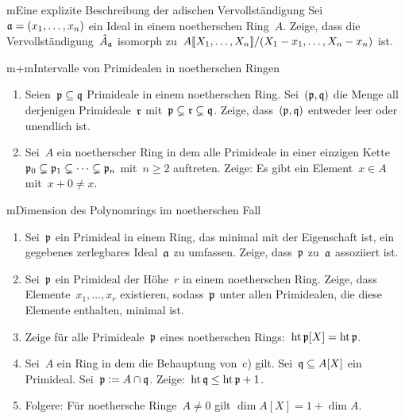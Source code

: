 \documentclass{uebblatt}
\begin{document}
\enlargethispage{2em}

\begin{aufgabe}{m}{Eine explizite Beschreibung der adischen Vervollständigung}
Sei~$\mathfrak{a} = (x_1,\ldots,x_n)$ ein Ideal in einem noetherschen Ring~$A$. Zeige,
dass die Vervollständigung~$\hat A_{\mathfrak{a}}$ isomorph
zu~${A}\llbracket{X_1,\ldots,X_n}\rrbracket/(X_1-x_1,\ldots,X_n-x_n)$ ist.
\end{aufgabe}

\begin{aufgabe}{m+m}{Intervalle von Primidealen in noetherschen Ringen}
\begin{enumerate}
\item
Seien~$\mathfrak{p} \subseteq \mathfrak{q}$ Primideale in einem
noetherschen Ring. Sei~$(\mathfrak{p},\mathfrak{q})$ die Menge all derjenigen Primideale~$\mathfrak{r}$
mit~$\mathfrak{p} \subsetneq \mathfrak{r} \subsetneq \mathfrak{q}$. Zeige, dass~$(\mathfrak{p},\mathfrak{q})$ entweder
leer oder unendlich ist.
\item Sei~$A$ ein noetherscher Ring in dem alle Primideale in einer einzigen Kette~$\mathfrak{p}_0
\subsetneq \mathfrak{p}_1 \subsetneq \cdots \subsetneq \mathfrak{p}_n$ mit~$n \geq 2$ auftreten.
Zeige: Es gibt ein Element~$x \in A$ mit~$x + 0 \neq x$.
\end{enumerate}
\end{aufgabe}

\begin{aufgabe}{m}{Dimension des Polynomrings im noetherschen Fall}
\begin{enumerate}
\item Sei~$\mathfrak{p}$ ein Primideal in einem Ring, das minimal mit der Eigenschaft
ist, ein gegebenes zerlegbares Ideal~$\mathfrak{a}$ zu umfassen. Zeige, dass~$\mathfrak{p}$
zu~$\mathfrak{a}$ assoziiert ist.
\item Sei~$\mathfrak{p}$ ein Primideal der Höhe~$r$ in einem noetherschen Ring.
Zeige, dass Elemente~$x_1,\ldots,x_r$ existieren, sodass~$\mathfrak{p}$ unter allen
Primidealen, die diese Elemente enthalten, minimal ist.
\item Zeige für alle Primideale~$\mathfrak{p}$ eines noetherschen Rings:~$\operatorname{ht}
\mathfrak{p}[X] = \operatorname{ht} \mathfrak{p}$.
\item Sei~$A$ ein Ring in dem die Behauptung von~c) gilt.
Sei~$\mathfrak{q} \subseteq A[X]$ ein Primideal. Sei~$\mathfrak{p} \vcentcolon= A \cap \mathfrak{q}$.
Zeige:~$\operatorname{ht} \mathfrak{q} \leq \operatorname{ht} \mathfrak{p} + 1$.
\item Folgere: Für noethersche Ringe~$A \neq 0$ gilt $\dim A[X] = 1 + \dim A$.
\end{enumerate}
\end{aufgabe}
\end{document}
